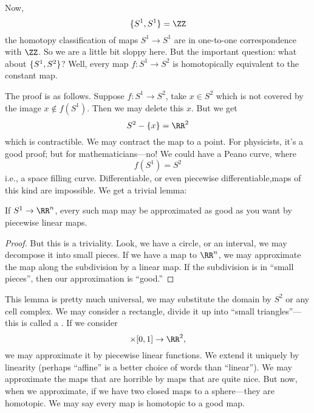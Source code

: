 Now,
\begin{equation}
\homotopyClass(S^1,S^1)=\ZZ
\end{equation}
the homotopy classification of maps $S^1\to S^1$ are in
one-to-one correspondence with $\ZZ$. So we are a little bit
sloppy here. But the important question: what about
$\homotopyClass(S^1,S^2)$? Well, every map $f\colon S^1\to S^2$
is homotopically equivalent to the constant map. 


The proof is as follows. Suppose $f\colon S^1\to S^2$, take
$x\in S^2$ which is not covered by the image $x\notin
f(S^1)$. Then we may delete this $x$. But we get
\begin{equation}
S^2-\{x\}=\RR^2
\end{equation}
which is contractible. We may contract the map to a point. For
physicists, it's a good proof; but for mathematicians---no! We
could have a Peano curve, where
\begin{equation}
f(S^1)=S^2
\end{equation}
i.e., a space filling curve. Differentiable, or even piecewise
differentiable,maps of this kind are impossible. We get a trivial
lemma:
\begin{lem}[Trivial]
If $S^1\to\RR^n$, every such map may be approximated as good as
you want by piecewise linear maps.
\end{lem}
\begin{proof}
But this is a triviality. Look, we have a circle, or an interval,
we may decompose it into small pieces. If we have a map to
$\RR^n$, we may approximate the map  along the subdivision by a
linear map. If the subdivision is in ``small pieces'', then our
approximation is ``good.''
\end{proof}
This lemma is pretty much universal, we may substitute the domain
by $S^2$ or any cell complex. We may consider a rectangle, divide
it up into ``small triangles''---this is called a
. If we consider
\begin{equation}
[0,1]\times[0,1]\to\RR^2,
\end{equation}
we may approximate it by piecewise linear functions. We extend it
uniquely by linearity (perhaps ``affine'' is a better choice of
words than ``linear''). We may approximate the maps that are
horrible by maps that are quite nice. But now, when we
approximate, if we have two closed maps to a sphere---they are
homotopic. We may say every map is homotopic to a good map.

